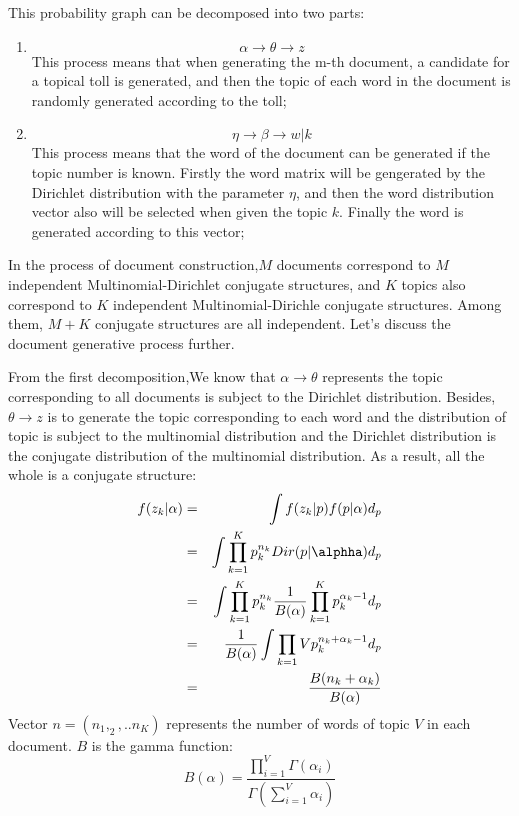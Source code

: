 This probability graph can be decomposed into two parts:
\begin{enumerate}
  \item $$\alpha \rightarrow \theta  \rightarrow z $$
This process means that when generating the m-th document, a candidate for a topical toll is generated, and then the topic of each word in the document is randomly generated according to the toll;
  \item $$\eta \rightarrow \beta  \rightarrow w|k $$This process means that the word of the document can be  generated if the topic number is known. Firstly the word matrix will be gengerated by the Dirichlet distribution with the parameter $\eta$, and then the word distribution vector also will be selected when given the topic $k$. Finally the word is generated according to this vector;
\end{enumerate}

In the process of document construction,$ M$ documents correspond to $M$ independent Multinomial-Dirichlet conjugate structures, and $K$ topics also correspond to $K$ independent Multinomial-Dirichle conjugate structures. Among them, $M+K$ conjugate structures are all independent. Let’s discuss the document generative process further.


From the first decomposition\cite{coolaps},We know that $\alpha \rightarrow \theta$ represents the topic corresponding to all documents is subject to the Dirichlet distribution. Besides,  $\theta  \rightarrow z$  is to generate the topic corresponding to each word and the distribution of topic is subject to the multinomial distribution and the Dirichlet distribution is the conjugate distribution of the multinomial distribution. As a result, all the whole is a conjugate structure:
\begin{eqnarray*}
  f(z_k|\alpha) &=& \int f(z_k|p)f(p|\alpha) d_p \\
              &=& \int \prod_{k=1}^K p_k^{n_k} Dir(p|\alphha) d_p \\
              &=& \int \prod_{k=1}^K p_k^{n_k} \frac{1}{B(\alpha)}\prod_{k=1}^{K}p_k^{\alpha_k-1} d_p \\
              &=& \frac{1}{B(\alpha)}\int \prod_{k=1}{V}p_k^{n_k+\alpha_k-1} d_p \\
              &=& \frac{B(n_k+\alpha_k)}{B(\alpha)}
\end{eqnarray*}
Vector $n = (n_1,_2,..n_K)$ represents the number of words of topic $V$ in each document.
$B$ is the gamma function:
\[
  B(\alpha) = \frac{\prod_{i=1}^V\Gamma(\alpha_i)}{\Gamma(\sum_{i=1}^V \alpha_i)}
\]

